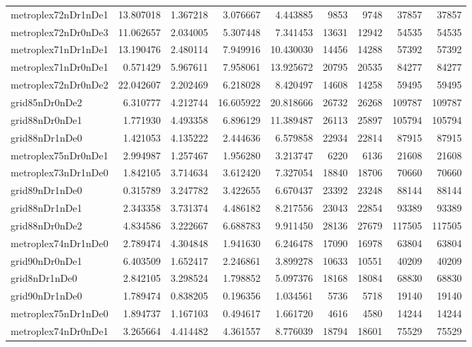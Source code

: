 \begin{longtable}{|l|r|r|r|r|r|r|r|r|}
metroplex72nDr1nDe1 & 13.807018 & 1.367218 & 3.076667 & 4.443885 & 9853 & 9748 & 37857 & 37857 \\
metroplex72nDr0nDe3 & 11.062657 & 2.034005 & 5.307448 & 7.341453 & 13631 & 12942 & 54535 & 54535 \\
metroplex71nDr1nDe1 & 13.190476 & 2.480114 & 7.949916 & 10.430030 & 14456 & 14288 & 57392 & 57392 \\
metroplex71nDr0nDe1 & 0.571429 & 5.967611 & 7.958061 & 13.925672 & 20795 & 20535 & 84277 & 84277 \\
metroplex72nDr0nDe2 & 22.042607 & 2.202469 & 6.218028 & 8.420497 & 14608 & 14258 & 59495 & 59495 \\
grid85nDr0nDe2 & 6.310777 & 4.212744 & 16.605922 & 20.818666 & 26732 & 26268 & 109787 & 109787 \\
grid88nDr0nDe1 & 1.771930 & 4.493358 & 6.896129 & 11.389487 & 26113 & 25897 & 105794 & 105794 \\
grid88nDr1nDe0 & 1.421053 & 4.135222 & 2.444636 & 6.579858 & 22934 & 22814 & 87915 & 87915 \\
metroplex75nDr0nDe1 & 2.994987 & 1.257467 & 1.956280 & 3.213747 & 6220 & 6136 & 21608 & 21608 \\
metroplex73nDr1nDe0 & 1.842105 & 3.714634 & 3.612420 & 7.327054 & 18840 & 18706 & 70660 & 70660 \\
grid89nDr1nDe0 & 0.315789 & 3.247782 & 3.422655 & 6.670437 & 23392 & 23248 & 88144 & 88144 \\
grid88nDr1nDe1 & 2.343358 & 3.731374 & 4.486182 & 8.217556 & 23043 & 22854 & 93389 & 93389 \\
grid88nDr0nDe2 & 4.834586 & 3.222667 & 6.688783 & 9.911450 & 28136 & 27679 & 117505 & 117505 \\
metroplex74nDr1nDe0 & 2.789474 & 4.304848 & 1.941630 & 6.246478 & 17090 & 16978 & 63804 & 63804 \\
grid90nDr0nDe1 & 6.403509 & 1.652417 & 2.246861 & 3.899278 & 10633 & 10551 & 40209 & 40209 \\
grid8nDr1nDe0 & 2.842105 & 3.298524 & 1.798852 & 5.097376 & 18168 & 18084 & 68830 & 68830 \\
grid90nDr1nDe0 & 1.789474 & 0.838205 & 0.196356 & 1.034561 & 5736 & 5718 & 19140 & 19140 \\
metroplex75nDr1nDe0 & 1.894737 & 1.167103 & 0.494617 & 1.661720 & 4616 & 4580 & 14244 & 14244 \\
metroplex74nDr0nDe1 & 3.265664 & 4.414482 & 4.361557 & 8.776039 & 18794 & 18601 & 75529 & 75529 \\

\end{longtable}
